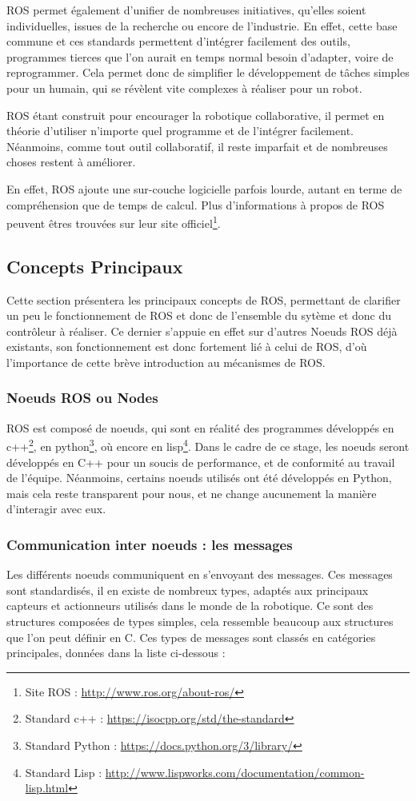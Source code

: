 \documentclass{tnreport}
\begin{document}
ROS permet également d'unifier de nombreuses initiatives, qu'elles soient individuelles, issues de la recherche ou encore de l'industrie. En effet, cette base commune et ces standards permettent d'intégrer facilement des outils, programmes tierces que l'on aurait en temps normal besoin d'adapter, voire de reprogrammer. Cela permet donc de simplifier le développement de tâches simples pour un humain, qui se révèlent vite complexes à réaliser pour un robot. 

ROS étant construit pour encourager la robotique collaborative, il permet en théorie d'utiliser n'importe quel programme et de l'intégrer facilement. Néanmoins, comme tout outil collaboratif, il reste imparfait et de nombreuses choses restent à améliorer.

En effet, ROS ajoute une sur-couche logicielle parfois lourde, autant en terme de compréhension que de temps de calcul. Plus d'informations à propos de ROS peuvent êtres trouvées sur leur site officiel\footnote{Site ROS : \url{http://www.ros.org/about-ros/}}.

\subsection{Concepts Principaux}
Cette section présentera les principaux concepts de \gls{ROS}, permettant de clarifier un peu le fonctionnement de \gls{ROS} et donc de l'ensemble du sytème et donc du contrôleur à réaliser. Ce dernier s'appuie en effet sur d'autres Noeuds \gls{ROS} déjà existants, son fonctionnement est donc fortement lié à celui de \gls{ROS}, d'où l'importance de cette brève introduction au mécanismes de \gls{ROS}. 
\newpage
\subsubsection{Noeuds ROS ou Nodes}
ROS est composé de noeuds, qui sont en réalité des programmes développés en c++\footnote{Standard c++ : \url{https://isocpp.org/std/the-standard}}, en python\footnote{Standard Python : \url{https://docs.python.org/3/library/}}, où encore en lisp\footnote{Standard Lisp : \url{http://www.lispworks.com/documentation/common-lisp.html}}. Dans le cadre de ce stage, les noeuds seront développés en C++ pour un soucis de performance, et de conformité au travail de l'équipe. Néanmoins, certains noeuds utilisés ont été développés en Python, mais cela reste transparent pour nous, et ne change aucunement la manière d'interagir avec eux. 
\subsubsection{Communication inter noeuds : les messages} \label{lb:msg}
Les différents noeuds communiquent en s'envoyant des messages. Ces messages sont standardisés, il en existe de nombreux types, adaptés aux principaux capteurs et actionneurs utilisés dans le monde de la robotique. Ce sont des structures composées de types simples, cela ressemble beaucoup aux structures que l'on peut définir en C. Ces types de messages sont classés en catégories principales, données dans la liste ci-dessous : 
\end{document}
